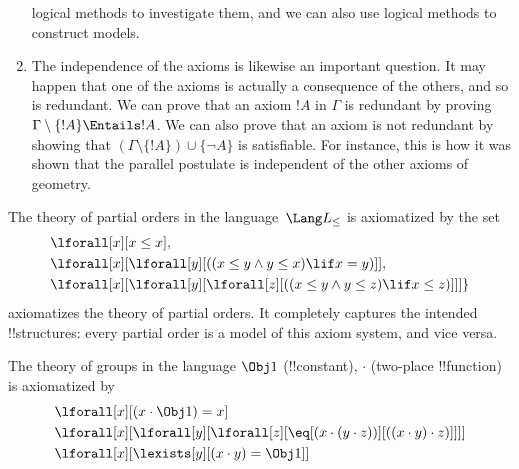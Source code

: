 \documentclass[../../include/open-logic-section]{subfiles}
\begin{document}
\begin{explain}
\begin{enumerate}
  logical methods to investigate them, and we can also use logical
  methods to construct models.
\item The independence of the axioms is likewise an important
  question.  It may happen that one of the axioms is actually a
  consequence of the others, and so is redundant.  We can prove that
  an axiom $!A$ in $\Gamma$ is redundant by proving $\Gamma \setminus
  \{!A\} \Entails !A$.  We can also prove that an axiom is not
  redundant by showing that $(\Gamma \setminus \{!A\}) \cup \{\lnot
  A\}$ is satisfiable. For instance, this is how it was shown that the
  parallel postulate is independent of the other axioms of geometry.
\end{enumerate}
\end{explain}

\begin{ex}
The theory of partial orders in the language~$\Lang L_\le$ is
axiomatized by the set
\begin{align*}
& \lforall[x][x \le x], \\
& \lforall[x][\lforall[y][((x \le y \land y \le
    x) \lif x = y)]], \\
& \lforall[x][\lforall[y][\lforall[z][((x \le y
      \land y \le z) \lif x \le z)]]]\}
\end{align*}
axiomatizes the theory of partial orders. It completely captures the
intended !!{structure}s: every partial order is a model of this axiom
system, and vice versa.
\end{ex}

\begin{ex}
The theory of groups in the language $\Obj 1$ (!!{constant}), $\cdot$
(two-place !!{function}) is axiomatized by
\begin{align*}
& \lforall[x][(x \cdot \Obj 1) = x]\\ 
& \lforall[x][\lforall[y][\lforall[z][\eq[(x \cdot (y \cdot z))][((x
          \cdot y) \cdot z)]]]]\\
& \lforall[x][\lexists[y][(x \cdot y) = \Obj 1]]
\end{align*}
\end{ex}
\end{document}
